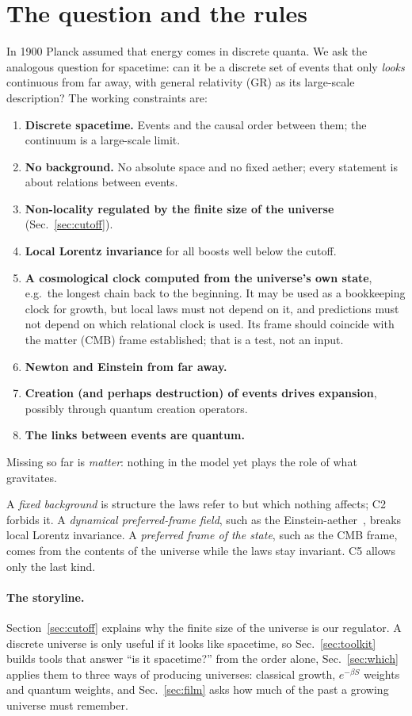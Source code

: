 \documentclass[11pt,a4paper]{article}
\newcommand{\tagbox}[2]{\textsf{\scriptsize\colorbox{#1!12}{\textcolor{#1!70!black}{#2}}}}
\newcommand{\est}{\tagbox{gray}{established}}
\begin{document}
\section{The question and the rules}
In 1900 Planck assumed that energy comes in discrete quanta. We ask the analogous question for spacetime: can it be a discrete set of events that only \emph{looks} continuous from far away, with general relativity (GR) as its large-scale description? The working constraints are:
\begin{enumerate}[label=\textbf{C\arabic*},leftmargin=*,itemsep=1pt]
\item \textbf{Discrete spacetime.} Events and the causal order between them; the continuum is a large-scale limit.
\item \textbf{No background.} No absolute space and no fixed aether; every statement is about relations between events.
\item \textbf{Non-locality regulated by the finite size of the universe} (Sec.~\ref{sec:cutoff}).
\item \textbf{Local Lorentz invariance} for all boosts well below the cutoff.
\item \textbf{A cosmological clock computed from the universe's own state}, e.g.\ the longest chain back to the beginning. It may be used as a bookkeeping clock for growth, but local laws must not depend on it, and predictions must not depend on which relational clock is used. Its frame should coincide with the matter (CMB) frame \est; that is a test, not an input.
\item \textbf{Newton and Einstein from far away.}
\item \textbf{Creation (and perhaps destruction) of events drives expansion}, possibly through quantum creation operators.
\item \textbf{The links between events are quantum.}
\end{enumerate}
Missing so far is \emph{matter}: nothing in the model yet plays the role of what gravitates.

A \emph{fixed background} is structure the laws refer to but which nothing affects; C2 forbids it. A \emph{dynamical preferred-frame field}, such as the Einstein-aether~\cite{JacobsonMattingly01}, breaks local Lorentz invariance. A \emph{preferred frame of the state}, such as the CMB frame, comes from the contents of the universe while the laws stay invariant. C5 allows only the last kind.

\paragraph{The storyline.} Section~\ref{sec:cutoff} explains why the finite size of the universe is our regulator. A discrete universe is only useful if it looks like spacetime, so Sec.~\ref{sec:toolkit} builds tools that answer ``is it spacetime?'' from the order alone, Sec.~\ref{sec:which} applies them to three ways of producing universes: classical growth, $e^{-\beta S}$ weights and quantum weights, and Sec.~\ref{sec:film} asks how much of the past a growing universe must remember.
\end{document}
